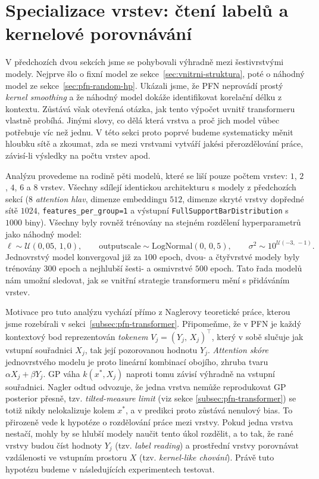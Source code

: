 \section{Specializace vrstev: čtení labelů a kernelové porovnávání}
\label{sec:specializace-vrstev}

V předchozích dvou sekcích jsme se pohybovali výhradně mezi šestivrstvými modely.
Nejprve šlo o fixní model ze sekce~\ref{sec:vnitrni-struktura}, poté o náhodný model ze sekce~\ref{sec:pfn-random-hp}.
Ukázali jsme, že PFN neprovádí prostý \emph{kernel smoothing} a že náhodný model dokáže identifikovat korelační délku z kontextu.
Zůstává však otevřená otázka, jak tento výpočet uvnitř transformeru vlastně probíhá.
Jinými slovy, co dělá která vrstva a proč jich model vůbec potřebuje víc než jednu.
V této sekci proto poprvé budeme systematicky měnit hloubku sítě a zkoumat, zda se mezi vrstvami vytváří jakési přerozdělování práce, závisí-li výsledky na počtu vrstev apod.
\par

Analýzu provedeme na rodině pěti modelů, které se liší pouze počtem vrstev: $1$, $2$, $4$, $6$ a $8$ vrstev.
Všechny sdílejí identickou architekturu s modely z předchozích sekcí ($8$ \emph{attention hlav}, dimenze embeddingu $512$, dimenze skryté vrstvy dopředné sítě $1024$, \lstinline|features_per_group=1| a výstupní \texttt{Full\-Support\-Bar\-Distribution} s $1000$ biny).
Všechny byly rovněž trénovány na stejném rozdělení hyperparametrů jako náhodný model:
$$\ell \sim \mathcal{U}(0{,}05,\, 1{,}0), \qquad \text{outputscale} \sim \text{LogNormal}(0,\, 0{,}5), \qquad \sigma^2 \sim 10^{\mathcal{U}(-3,\,-1)}.$$
Jednovrstvý model konvergoval již za $100$ epoch, dvou- a čtyřvrstvé modely byly trénovány $300$ epoch a nejhlubší šesti- a osmivrstvé $500$ epoch.
Tato řada modelů nám umožní sledovat, jak se vnitřní strategie transformeru mění s přidáváním vrstev.
\par

Motivace pro tuto analýzu vychází přímo z Naglerovy teoretické práce, kterou jsme rozebírali v sekci~\ref{subsec:pfn-transformer}.
Připomeňme, že v PFN je každý kontextový bod reprezentován \emph{tokenem} $V_j = (Y_j,\, X_j)^\top$, který v sobě slučuje jak vstupní souřadnici $X_j$, tak její pozorovanou hodnotu $Y_j$.
\emph{Attention skóre} jednovrstvého modelu je proto lineární kombinací obojího, zhruba tvaru $\alpha X_j + \beta Y_j$.
GP váha $k(x^*, X_j)$ naproti tomu závisí výhradně na vstupní souřadnici.
Nagler odtud odvozuje, že jedna vrstva nemůže reprodukovat GP posterior přesně, tzv. \emph{tilted-measure limit} (viz sekce \ref{subsec:pfn-transformer}) se totiž nikdy nelokalizuje kolem $x^*$, a v predikci proto zůstává nenulový bias.
To přirozeně vede k hypotéze o rozdělování práce mezi vrstvy.
Pokud jedna vrstva nestačí, mohly by se hlubší modely naučit tento úkol rozdělit, a to tak, že rané vrstvy budou číst hodnoty $Y_j$ (tzv. \emph{label reading}) a prostřední vrstvy porovnávat vzdálenosti ve vstupním prostoru $X$ (tzv. \emph{kernel-like chování}).
Právě tuto hypotézu budeme v následujících experimentech testovat.
\par

